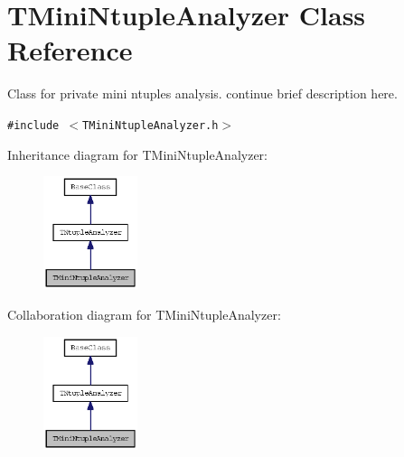 \section{TMini\-Ntuple\-Analyzer Class Reference}
\label{classTMiniNtupleAnalyzer}
Class for private mini ntuples analysis. continue brief description here.  


{\tt \#include $<$TMini\-Ntuple\-Analyzer.h$>$}

Inheritance diagram for TMini\-Ntuple\-Analyzer:\begin{figure}[H]
\begin{center}
\leavevmode
\includegraphics[width=78pt]{classTMiniNtupleAnalyzer__inherit__graph}
\end{center}
\end{figure}
Collaboration diagram for TMini\-Ntuple\-Analyzer:\begin{figure}[H]
\begin{center}
\leavevmode
\includegraphics[width=78pt]{classTMiniNtupleAnalyzer__coll__graph}
\end{center}
\end{figure}
